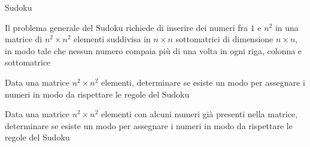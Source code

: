 \begin{frame}{Sudoku}

\vspace{-9pt}
\begin{myboxtitle}
Il problema generale del \alert{Sudoku} richiede di inserire dei numeri
fra $1$ e $n^2$ in una matrice di $n^2 \times n^2$ elementi 
suddivisa in $n \times n$ sottomatrici di dimensione $n \times n$, 
in modo tale che nessun  numero compaia più di una volta in ogni 
riga, colonna e sottomatrice
\end{myboxtitle}

\begin{myboxtitle}
Data una matrice $n^2 \times n^2$ elementi, determinare se esiste un modo per assegnare i numeri in modo da rispettare le regole del Sudoku
\end{myboxtitle}

\begin{myboxtitle}
Data una matrice $n^2 \times n^2$ elementi con alcuni numeri già presenti nella matrice, determinare se esiste un modo per assegnare i numeri in modo da rispettare le regole del Sudoku
\end{myboxtitle}

\end{frame}


